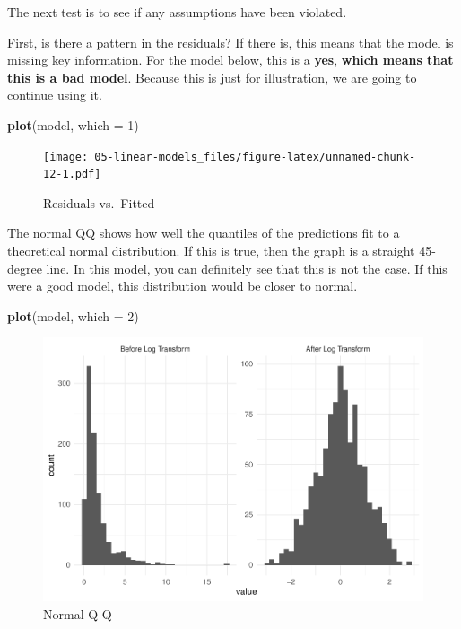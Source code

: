 \documentclass[openany]{book}
\newenvironment{Shaded}{\begin{snugshade}}{\end{snugshade}}
\newcommand{\DataTypeTok}[1]{\textcolor[rgb]{0.13,0.29,0.53}{#1}}
\newcommand{\DecValTok}[1]{\textcolor[rgb]{0.00,0.00,0.81}{#1}}
\newcommand{\KeywordTok}[1]{\textcolor[rgb]{0.13,0.29,0.53}{\textbf{#1}}}
\newcommand{\NormalTok}[1]{#1}
\begin{document}
The next test is to see if any assumptions have been violated.

First, is there a pattern in the residuals? If there is, this means that the model is missing key information. For the model below, this is a \textbf{yes}, \textbf{which means that this is a bad model}. Because this is just for illustration, we are going to continue using it.

\begin{Shaded}
\begin{Highlighting}[]
\KeywordTok{plot}\NormalTok{(model, }\DataTypeTok{which =} \DecValTok{1}\NormalTok{)}
\end{Highlighting}
\end{Shaded}

\begin{figure}
\centering
\texttt{[image: 05-linear-models\_files/figure-latex/unnamed-chunk-12-1.pdf]}
\caption{\label{fig:unnamed-chunk-12}Residuals vs.~Fitted}
\end{figure}

The normal QQ shows how well the quantiles of the predictions fit to a theoretical normal distribution. If this is true, then the graph is a straight 45-degree line. In this model, you can definitely see that this is not the case. If this were a good model, this distribution would be closer to normal.

\begin{Shaded}
\begin{Highlighting}[]
\KeywordTok{plot}\NormalTok{(model, }\DataTypeTok{which =} \DecValTok{2}\NormalTok{)}
\end{Highlighting}
\end{Shaded}

\begin{figure}
\centering
\includegraphics{05-linear-models_files/figure-latex/unnamed-chunk-13-1.pdf}
\caption{\label{fig:unnamed-chunk-13}Normal Q-Q}
\end{figure}
\end{document}
